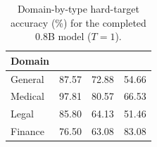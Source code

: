 \begin{table}[t]
\centering
\small
\setlength{\tabcolsep}{4pt}
\caption{Domain-by-type hard-target accuracy (\%) for the completed 0.8B model ($T=1$).}
\label{tab:domain-type}
\begin{tabular}{lrrr}
\toprule
Domain & \noul{} & \choice{} & \score{} \\
\midrule
General & 87.57 & 72.88 & 54.66 \\
Medical & 97.81 & 80.57 & 66.53 \\
Legal & 85.80 & 64.13 & 51.46 \\
Finance & 76.50 & 63.08 & 83.08 \\
\bottomrule
\end{tabular}
\end{table}
